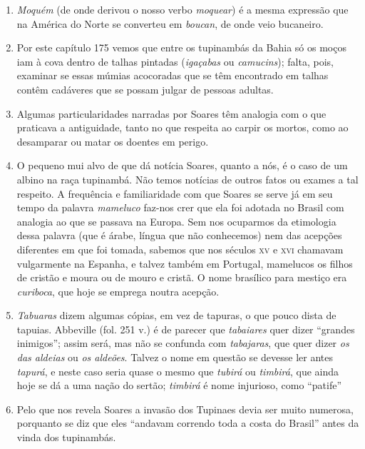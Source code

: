 \begin{enumerate}
\item \textit{Moquém} (de onde derivou o nosso verbo \textit{moquear}) é a mesma expressão que na 
América do Norte se converteu em \textit{boucan}, de onde veio bucaneiro.

\item Por este capítulo 175 vemos que entre os tupinambás da Bahia só os moços iam à 
cova dentro de talhas pintadas (\textit{igaçabas} ou \textit{camucins}); falta, pois, examinar se essas 
múmias acocoradas que se têm encontrado em talhas contêm cadáveres que se possam 
julgar de pessoas adultas.

\item Algumas particularidades narradas por Soares têm analogia com o que praticava a 
antiguidade, tanto no que respeita ao carpir os mortos, como ao desamparar ou matar os 
doentes em perigo.

\item O pequeno mui alvo de que dá notícia Soares, quanto a nós, é o caso de um albino 
na raça tupinambá. Não temos notícias de outros fatos ou exames a tal respeito.
A frequência e familiaridade com que Soares se serve já em seu tempo da palavra 
\textit{mameluco} faz-nos crer que ela foi adotada no Brasil com analogia ao que se passava na 
Europa. Sem nos ocuparmos da etimologia dessa palavra (que é árabe, língua que não 
conhecemos) nem das acepções diferentes em que foi tomada, sabemos que nos séculos \textsc{xv} e 
\textsc{xvi} chamavam vulgarmente na Espanha, e talvez também em Portugal, mamelucos os 
filhos de cristão e moura ou de mouro e cristã. O nome brasílico para mestiço era \textit{curiboca}, 
que hoje se emprega noutra acepção.

\item  \textit{Tabuaras} dizem algumas cópias, em vez de tapuras, o que pouco
dista de tapuias. Abbeville (fol. 251 v.) é de parecer que \textit{tabaiares} quer
dizer ``grandes inimigos'';  assim será, mas não se confunda com \textit{tabajaras}, que quer 
dizer \textit{os das aldeias} ou \textit{os aldeões}.  Talvez o nome em questão se devesse ler 
antes \textit{tapurá}, e neste caso seria quase o mesmo que \textit{tubirá} ou \textit{timbirá}, que ainda hoje se dá a 
uma nação do sertão; \textit{timbirá} é nome injurioso, como ``patife'' 

\item Pelo que nos revela Soares a invasão dos Tupinaes devia ser muito numerosa, 
porquanto se diz que eles ``andavam correndo toda a costa do Brasil''  antes da vinda 
dos tupinambás.


\end{enumerate}
